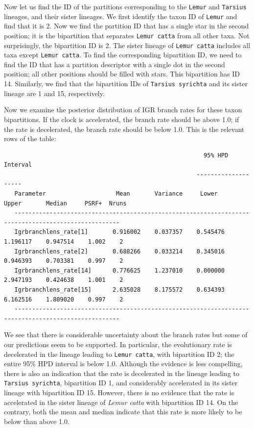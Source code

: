 \documentclass[12pt]{book}
\begin{document}
Now let us find the ID of the partitions corresponding to the \texttt{Lemur} and \texttt{Tarsius} lineages, and their
sister lineages. We first identify the taxon ID of \texttt{Lemur} and find that it is 2. Now we find the partition ID
that has a single star in the second position; it is the bipartition that separates \texttt{Lemur catta} from all other
taxa. Not surprisingly, the bipartition ID is 2. The sister lineage of \texttt{Lemur catta} includes all taxa except
\texttt{Lemur catta}. To
find the corresponding bipartition ID, we need to find the ID that has a partition descriptor with a single
dot in the second position; all other positions should be filled with stars. This bipartition has ID 14. Similarly,
we find that the bipartition IDs of \texttt{Tarsius syrichta} and its sister lineage are 1 and 15, respectively.

Now we examine the posterior distribution of IGR branch rates for these taxon bipartitions. If the clock is
accelerated, the branch rate should be above 1.0; if the rate is decelerated, the branch rate should be
below 1.0. This is the relevant rows of the table:

\scriptsize
\begin{singlespacing}
\begin{verbatim}
                                                         95% HPD Interval
                                                       --------------------
   Parameter                    Mean       Variance     Lower       Upper       Median     PSRF+  Nruns
   ----------------------------------------------------------------------------------------------------
   Igrbranchlens_rate[1]       0.916002    0.037357    0.545476    1.196117    0.947514    1.002    2
   Igrbranchlens_rate[2]       0.688266    0.033214    0.345016    0.946393    0.703381    0.997    2
   Igrbranchlens_rate[14]      0.776625    1.237010    0.000000    2.947193    0.424638    1.001    2
   Igrbranchlens_rate[15]      2.635028    8.175572    0.634393    6.162516    1.809020    0.997    2
   ----------------------------------------------------------------------------------------------------
\end{verbatim}
\end{singlespacing}
\normalsize

We see that there is considerable uncertainty about the branch rates but some of our predictions seem to be
supported. In particular, the evolutionary rate is decelerated in the lineage leading to \texttt{Lemur catta},
with bipartition ID 2; the entire 95\% HPD interval is below 1.0. Although the evidence is less compelling,
there is also an indication that the rate is decelerated in the lineage leading to \texttt{Tarsius syrichta},
bipartition ID 1, and considerably accelerated in its sister lineage with bipartition ID 15. However, there is no
evidence that the rate is accelerated in the sister lineage of \textit{Lemur catta} with bipartition ID 14. On the
contrary, both the mean and median indicate that this rate is more likely to be below than above 1.0.
\end{document}
